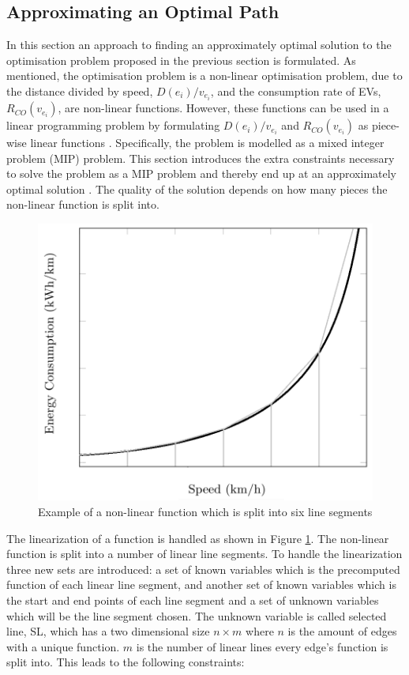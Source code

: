 \subsection{Approximating an Optimal Path}\label{sec:LP}
In this section an approach to finding an approximately optimal solution to the optimisation problem proposed in the previous section is formulated. As mentioned, the optimisation problem is a non-linear optimisation problem, due to the distance divided by speed, \( D(e_i)/v_{e_i} \), and the consumption rate of EVs, $R_{CO}(v_{e_i})$, are non-linear functions. However, these functions can be used in a linear programming problem by formulating \( D(e_i)/v_{e_i} \) and $R_{CO}(v_{e_i})$ as piece-wise linear functions \cite{ahuja1995capacity}. Specifically, the problem is modelled as a mixed integer problem (MIP) problem. This section introduces the extra constraints necessary to solve the problem as a MIP problem and thereby end up at an approximately optimal solution \cite{piecewiseglpk}. The quality of the solution depends on how many pieces the non-linear function is split into.


\begin{figure}[!htb]
\centering
\includegraphics[scale=0.33]{images/linearization_example}
\caption{Example of a non-linear function which is split into six line segments}
\label{fig:linearization_example}
\end{figure}

The linearization of a function is handled as shown in Figure \ref{fig:linearization_example}. The non-linear function is split into a number of linear line segments. To handle the linearization three new sets are introduced: a set of known variables which is the precomputed function of each linear line segment, and another set of known variables which is the start and end points of each line segment and a set of unknown variables which will be the line segment chosen. The unknown variable is called selected line, SL, which has a two dimensional size $n \times m$ where $n$ is the amount of edges with a unique function. $m$ is the number of linear lines every edge's function is split into. This leads to the following constraints:  

